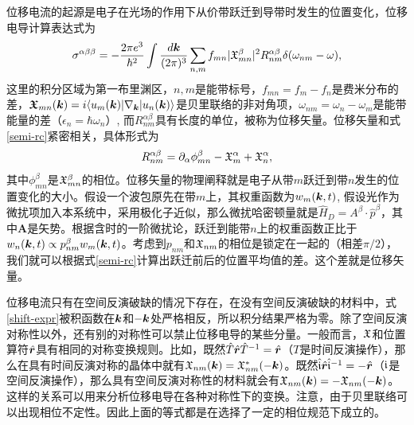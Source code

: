位移电流的起源是电子在光场的作用下从价带跃迁到导带时发生的位置变化，位移电导计算表达式为
\begin{equation}
\sigma^{\alpha\beta\beta}=-\frac{2\pi e^3}{\hbar^2}\int \frac{d\boldsymbol{k}}{(2\pi)^3}\sum_{n,m}f_{mn}|\mathfrak{X}^\beta_{mn}|^2 R_{nm}^{\alpha\beta} \delta(\omega_{nm}-\omega),\label{shift-expr}
\end{equation}
这里的积分区域为第一布里渊区，$n,m$是能带标号，$f_{mn}=f_m-f_n$是费米分布的差，$\boldsymbol{\mathfrak{X}}_{mn}(\boldsymbol{k})=i \langle u_m(\boldsymbol{k})|\nabla_{\boldsymbol{k}}|u_n(\boldsymbol{k}) \rangle$是贝里联络的非对角项，$\omega_{nm}=\omega_n-\omega_m$是能带能量的差（$\epsilon_n=\hbar\omega_n$）, 而$R_{nm}^{\alpha\beta}$具有长度的单位，被称为位移矢量。位移矢量和式\ref{semi-rc}紧密相关，具体形式为
\begin{equation}
R_{nm}^{\alpha\beta}=\partial_\alpha \phi_{mn}^{\beta}-\mathfrak{X}_m^\alpha+\mathfrak{X}_n^\alpha,
\end{equation}
其中$\phi_{mn}^{\beta}$是$\mathfrak{X}_{mn}^{\beta}$的相位。位移矢量的物理阐释就是电子从带$m$跃迁到带$n$发生的位置变化的大小。假设一个波包原先在带$m$上，其权重函数为$w_m(\boldsymbol{k},t)$, 假设光作为微扰项加入本系统中，采用极化子近似，那么微扰哈密顿量就是$\hat{H}_D=A^\beta\cdot\hat{p}^\beta$，其中$\boldsymbol{A}$是矢势。根据含时的一阶微扰论，跃迁到能带$n$上的权重函数正比于$w_n(\boldsymbol{k}, t)\propto p^{\beta}_{nm}w_m(\boldsymbol{k}, t)$。考虑到$p_{nm}$和$\mathfrak{X}_{nm}$的相位是锁定在一起的（相差$\pi/2$），我们就可以根据式\ref{semi-rc}计算出跃迁前后的位置平均值的差。这个差就是位移矢量。

位移电流只有在空间反演破缺的情况下存在，在没有空间反演破缺的材料中，式\ref{shift-expr}被积函数在$\boldsymbol{k}$和$-\boldsymbol{k}$处严格相反，所以积分结果严格为零。除了空间反演对称性以外，还有别的对称性可以禁止位移电导的某些分量。一般而言，$\mathfrak{X}$和位置算符$\hat{\boldsymbol{r}}$具有相同的对称变换规则。比如，既然$\hat{T}\hat{\boldsymbol{r}}\hat{T}^{-1}=\hat{\boldsymbol{r}}$（$T$是时间反演操作），那么在具有时间反演对称的晶体中就有$\mathfrak{X}_{nm}(\boldsymbol{k})=\mathfrak{X}_{nm}^*(-\boldsymbol{k})$。既然$\hat{\mathfrak{i}} \hat{\boldsymbol{r}} \hat{\mathfrak{i}}^{-1}=-\hat{\boldsymbol{r}}$（$\mathfrak{i}$是空间反演操作），那么具有空间反演对称性的材料就会有$\mathfrak{X}_{nm}(\boldsymbol{k})=-\mathfrak{X}_{nm}(-\boldsymbol{k})$。这样的关系可以用来分析位移电导在各种对称性下的变换。注意，由于贝里联络可以出现相位不定性。因此上面的等式都是在选择了一定的相位规范下成立的。


